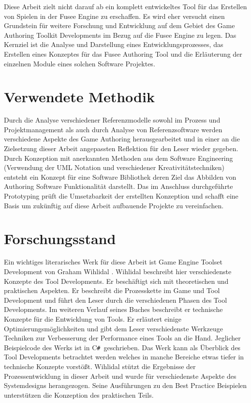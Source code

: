\documentclass[pagesize, paper=a4, fontsize=12pt, titlepage=true, headings=small, headnosepline, abstractoff, liststotoc, nochapterprefix, plainheadsepline, twoside]{scrreprt}
\newcommand{\CSS}{C\texttt{\# }}
\begin{document}
Diese Arbeit zielt nicht darauf ab ein komplett entwickeltes Tool für das Erstellen von Spielen in der Fusee Engine zu erschaffen. Es wird eher versucht einen Grundstein für weitere Forschung und Entwicklung auf dem Gebiet des Game Authoring Toolkit Developments im Bezug auf die Fusee Engine zu legen. Das Kernziel ist die Analyse und Darstellung eines Entwicklungsprozesses, das Erstellen eines Konzeptes für das Fusee Authoring Tool und die Erläuterung der einzelnen Module eines solchen Software Projektes.

\section{Verwendete Methodik}
Durch die Analyse verschiedener Referenzmodelle sowohl im Prozess und Projektmanagement als auch durch Analyse von Referenzsoftware werden verschiedene Aspekte des Game Authoring herausgearbeitet und in einer an die Zielsetzung dieser Arbeit angepassten Reflektion für den Leser wieder gegeben.
Durch Konzeption mit anerkannten Methoden aus dem Software Engineering (Verwendung der UML Notation und verschiedener Kreativitätstechniken) entsteht ein Konzept für eine Software Bibliothek deren Ziel das Abbilden von Authoring Software Funktionalität darstellt.
Das im Anschluss durchgeführte Prototyping prüft die Umsetzbarkeit der erstellten Konzeption und schafft eine Basis um zukünftig auf diese Arbeit aufbauende Projekte zu vereinfachen.

\section{Forschungsstand}
Ein wichtiges literarisches Werk für diese Arbeit ist Game Engine Toolset Development von Graham Wihlidal \parencite{Wihlidal2006}.  Wihlidal beschreibt hier verschiedenste Konzepte des Tool Developments. Er beschäftigt sich mit theoretischen und praktischen Aspekten. Er beschreibt die Prozesskette im Game und Tool Development und führt den Leser durch die verschiedenen Phasen des Tool Developments. Im weiteren Verlauf seines Buches beschreibt er technische Konzepte für die Entwicklung von Tools. Er erläutert einige Optimierungsmöglichkeiten und gibt dem Leser verschiedenste Werkzeuge Techniken zur Verbesserung der Performance eines Tools an die Hand. Jeglicher Beispielcode des Werks ist in \CSS geschrieben. Das Werk kann als Überblick des Tool Developments betrachtet werden welches in manche Bereiche etwas tiefer in technische Konzepte vorstößt. Wihlidal stützt die Ergebnisse der Prozessentwicklung in dieser Arbeit und wurde für verschiedenste Aspekte des Systemdesigns herangezogen. Seine Ausführungen zu den Best Practice Beispielen unterstützen die Konzeption des praktischen Teils.
\end{document}
